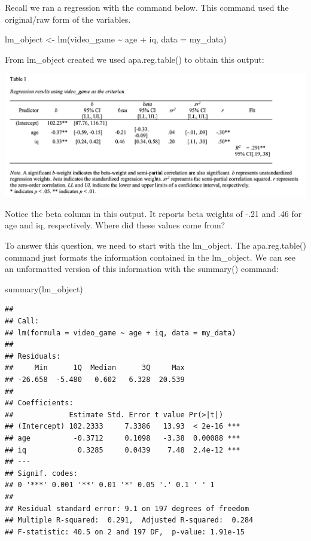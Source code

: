 \documentclass[
]{krantz}
\makeatletter
\newenvironment{Shaded}{\begin{snugshade}}{\end{snugshade}}
\newcommand{\AttributeTok}[1]{\textcolor[rgb]{0.61,0.61,0.61}{#1}}
\newcommand{\FunctionTok}[1]{\textcolor[rgb]{0,0,0}{#1}}
\newcommand{\NormalTok}[1]{#1}
\newcommand{\OtherTok}[1]{\textcolor[rgb]{0.37,0.37,0.37}{#1}}
\newcommand{\SpecialCharTok}[1]{\textcolor[rgb]{0,0,0}{#1}}
\newenvironment{kframe}{%
\medskip{}
\setlength{\fboxsep}{.8em}
 \def\at@end@of@kframe{}%
 \ifinner\ifhmode%
  \def\at@end@of@kframe{\end{minipage}}%
  \begin{minipage}{\columnwidth}%
 \fi\fi%
 \def\FrameCommand##1{\hskip\@totalleftmargin \hskip-\fboxsep
 \colorbox{shadecolor}{##1}\hskip-\fboxsep
     \hskip-\linewidth \hskip-\@totalleftmargin \hskip\columnwidth}%
 \MakeFramed {\advance\hsize-\width
   \@totalleftmargin\z@ \linewidth\hsize
   \@setminipage}}%
 {\par\unskip\endMakeFramed%
 \at@end@of@kframe}
\renewenvironment{Shaded}{\begin{kframe}}{\end{kframe}}
\makeatother
\begin{document}
Recall we ran a regression with the command below. This command used the original/raw form of the variables.

\begin{Shaded}
\begin{Highlighting}[]
\NormalTok{lm\_object }\OtherTok{\textless{}{-}} \FunctionTok{lm}\NormalTok{(video\_game }\SpecialCharTok{\textasciitilde{}}\NormalTok{ age }\SpecialCharTok{+}\NormalTok{ iq,}
                    \AttributeTok{data =}\NormalTok{ my\_data)}
\end{Highlighting}
\end{Shaded}

From lm\_object created we used apa.reg.table() to obtain this output:

\includegraphics[width=0.9\linewidth]{ch_multiple_regression/images/mr_table}

Notice the beta column in this output. It reports beta weights of -.21 and .46 for age and iq, respectively. Where did these values come from?

To answer this question, we need to start with the lm\_object. The apa.reg.table() command just formats the information contained in the lm\_object. We can see an unformatted version of this information with the summary() command:

\begin{Shaded}
\begin{Highlighting}[]
\FunctionTok{summary}\NormalTok{(lm\_object)}
\end{Highlighting}
\end{Shaded}

\begin{verbatim}
## 
## Call:
## lm(formula = video_game ~ age + iq, data = my_data)
## 
## Residuals:
##     Min      1Q  Median      3Q     Max 
## -26.658  -5.480   0.602   6.328  20.539 
## 
## Coefficients:
##             Estimate Std. Error t value Pr(>|t|)    
## (Intercept) 102.2333     7.3386   13.93  < 2e-16 ***
## age          -0.3712     0.1098   -3.38  0.00088 ***
## iq            0.3285     0.0439    7.48  2.4e-12 ***
## ---
## Signif. codes:  
## 0 '***' 0.001 '**' 0.01 '*' 0.05 '.' 0.1 ' ' 1
## 
## Residual standard error: 9.1 on 197 degrees of freedom
## Multiple R-squared:  0.291,  Adjusted R-squared:  0.284 
## F-statistic: 40.5 on 2 and 197 DF,  p-value: 1.91e-15
\end{verbatim}
\end{document}

